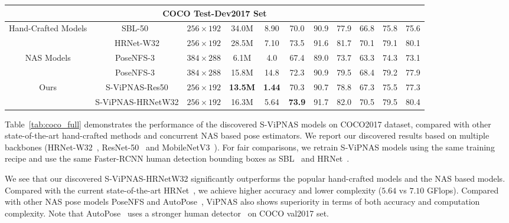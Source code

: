 \documentclass[final]{cvpr}
\begin{document}
\begin{table*}[tb]
\begin{center}
{\begin{tabular}{ c | c | c | c | c | c c c c c c}
    \multicolumn{11}{c}{COCO Test-Dev2017 Set} \\\hline
    \multirow{2}{*}{Hand-Crafted Models} & SBL-50~\cite{xiao2018simple} & $256 \times 192$ & 34.0M & 8.90 & 70.0 & 90.9 & 77.9 & 66.8 & 75.8 & 75.6 \\ 
    ~ & HRNet-W32\cite{sun2019deep} & $256 \times 192$ & 28.5M & 7.10 & 73.5 & 91.6 & 81.7 & 70.1 & 79.1 & 80.1 \\ \hline
    \multirow{2}{*}{NAS Models} & PoseNFS-3~\cite{yang2019pose} & $384 \times 288$ & 6.1M & 4.0 & 67.4 & 89.0 & 73.7 & 63.3 & 74.3 & 73.1 \\ 
     ~ & PoseNFS-3~\cite{yang2019pose} & $384 \times 288$ & 15.8M & 14.8  & 72.3 & 90.9 & 79.5 & 68.4 & 79.2 & 77.9 \\ \hline
    \multirow{2}{*}{Ours} & S-ViPNAS-Res50 & $256 \times 192$ & \textbf{13.5M} & \textbf{1.44} & 70.3  & 90.7 & 78.8 & 67.3 & 75.5 & 77.3 \\ 
    ~ & S-ViPNAS-HRNetW32 & $256 \times 192$ & 16.3M & 5.64 & \textbf{73.9} & 91.7 & 82.0 & 70.5 & 79.5 & 80.4 \\ \hline
    \end{tabular}
}
\label{tab:coco_full}
\end{center}
\vspace{-8pt}
\end{table*}

Table~\ref{tab:coco_full} demonstrates the performance of the discovered S-ViPNAS models on COCO2017 dataset, compared with other state-of-the-art hand-crafted methods and concurrent NAS based pose estimators. We report our discovered results based on multiple backbones (\ie HRNet-W32~\cite{sun2019deep}, ResNet-50~\cite{he2016deep} and MobileNetV3~\cite{howard2019searching}). For fair comparisons, we retrain S-ViPNAS models using the same training recipe and use the same Faster-RCNN human detection bounding boxes as SBL~\cite{xiao2018simple} and HRNet~\cite{sun2019deep}.

We see that our discovered S-ViPNAS-HRNetW32 significantly outperforms the popular hand-crafted models and the NAS based models.
Compared with the current state-of-the-art HRNet~\cite{sun2019deep}, we achieve higher accuracy and lower complexity ($5.64$ vs $7.10$ GFlops). Compared with other NAS pose models PoseNFS \cite{yang2019pose} and AutoPose~\cite{gong2020autopose}, ViPNAS also shows superiority in terms of both accuracy and computation complexity.
Note that AutoPose~\cite{gong2020autopose} uses a stronger human detector~\cite{chen2019hybrid} on COCO val2017 set.
\end{document}
